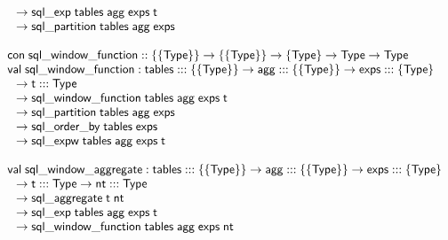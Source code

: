 \documentclass{article}
\begin{document}
{\begin{displaymath}
\begin{array}{l}
  \hspace{.1in} \to \mathsf{sql\_exp} \; \mathsf{tables} \; \mathsf{agg} \; \mathsf{exps} \; \mathsf{t} \\
  \hspace{.1in} \to \mathsf{sql\_partition} \; \mathsf{tables} \; \mathsf{agg} \; \mathsf{exps} \\
  \\
  \mathsf{con} \; \mathsf{sql\_window\_function} :: \{\{\mathsf{Type}\}\} \to \{\{\mathsf{Type}\}\} \to \{\mathsf{Type}\} \to \mathsf{Type} \to \mathsf{Type} \\
  \mathsf{val} \; \mathsf{sql\_window\_function} : \mathsf{tables} ::: \{\{\mathsf{Type}\}\} \to \mathsf{agg} ::: \{\{\mathsf{Type}\}\} \to \mathsf{exps} ::: \{\mathsf{Type}\} \\
  \hspace{.1in} \to \mathsf{t} ::: \mathsf{Type} \\
  \hspace{.1in} \to \mathsf{sql\_window\_function} \; \mathsf{tables} \; \mathsf{agg} \; \mathsf{exps} \; \mathsf{t} \\
  \hspace{.1in} \to \mathsf{sql\_partition} \; \mathsf{tables} \; \mathsf{agg} \; \mathsf{exps} \\
  \hspace{.1in} \to \mathsf{sql\_order\_by} \; \mathsf{tables} \; \mathsf{exps} \\
  \hspace{.1in} \to \mathsf{sql\_expw} \; \mathsf{tables} \; \mathsf{agg} \; \mathsf{exps} \; \mathsf{t} \\
  \\
  \mathsf{val} \; \mathsf{sql\_window\_aggregate} : \mathsf{tables} ::: \{\{\mathsf{Type}\}\} \to \mathsf{agg} ::: \{\{\mathsf{Type}\}\} \to \mathsf{exps} ::: \{\mathsf{Type}\} \\
  \hspace{.1in} \to \mathsf{t} ::: \mathsf{Type} \to \mathsf{nt} ::: \mathsf{Type} \\
  \hspace{.1in} \to \mathsf{sql\_aggregate} \; \mathsf{t} \; \mathsf{nt} \\
  \hspace{.1in} \to \mathsf{sql\_exp} \; \mathsf{tables} \; \mathsf{agg} \; \mathsf{exps} \; \mathsf{t} \\
  \hspace{.1in} \to \mathsf{sql\_window\_function} \; \mathsf{tables} \; \mathsf{agg} \; \mathsf{exps} \; \mathsf{nt} \\

\end{array}
\end{displaymath}}
\end{document}
